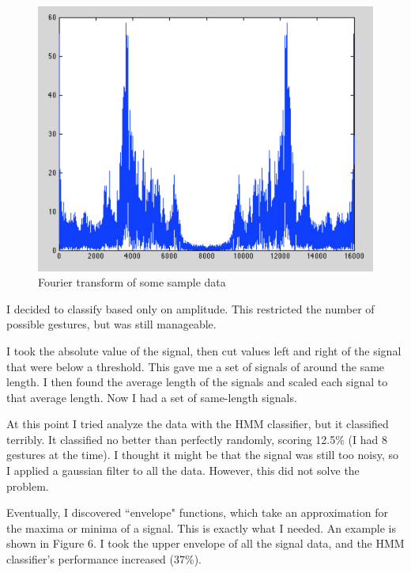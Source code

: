 \documentclass[12pt]{article}
\begin{document}
\begin{figure}[h!]
\centering
\includegraphics[scale=0.7]{fft.png}
\caption{Fourier transform of some sample data}
\end{figure}

I decided to classify based only on amplitude. This restricted the number of possible gestures, but was still manageable.

I took the absolute value of the signal, then cut values left and right of the signal that were below a threshold. This gave me a set of signals of around the same length. I then found the average length of the signals and scaled each signal to that average length. Now I had a set of same-length signals.

At this point I tried analyze the data with the HMM classifier, but it classified terribly. It classified no better than perfectly randomly, scoring 12.5\% (I had 8 gestures at the time). I thought it might be that the signal was still too noisy, so I applied a gaussian filter to all the data. However, this did not solve the problem.

Eventually, I discovered ``envelope" functions, which take an approximation for the maxima or minima of a signal. This is exactly what I needed. An example is shown in Figure 6. I took the upper envelope of all the signal data, and the HMM classifier's performance increased (37\%).
\end{document}
